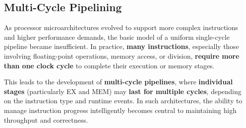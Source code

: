 \subsection{Multi-Cycle Pipelining}

As processor microarchitectures evolved to support more complex instructions and higher performance demands, the basic model of a uniform single-cycle pipeline became insufficient. In practice, \textbf{many instructions}, especially those involving floating-point operations, memory access, or division, \textbf{require more than one clock cycle} to complete their execution or memory stages.

\highspace
This leads to the development of \textbf{multi-cycle pipelines}, where \textbf{individual stages} (particularly EX and MEM) may \textbf{last for multiple cycles}, depending on the instruction type and runtime events. In such architectures, the ability to manage instruction progress intelligently becomes central to maintaining high throughput and correctness.

